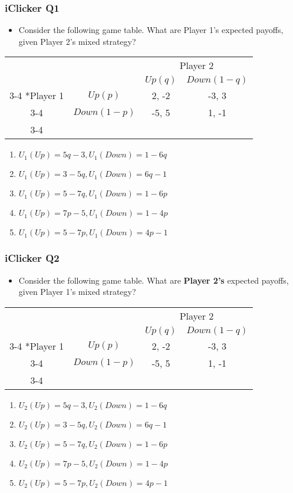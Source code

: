 \begin{frame}
\frametitle{iClicker Q1}
\begin{itemize}
\item Consider the following game table. What are Player 1's expected payoffs, given Player 2's mixed strategy?
\end{itemize}
\begin{table}[h]
\centering
\begin{tabular}{cc|c|c|}
	& \multicolumn{1}{c}{} & \multicolumn{2}{c}{Player 2}\\
	& \multicolumn{1}{c}{} & \multicolumn{1}{c}{$Up (q)$}  & \multicolumn{1}{c}{$Down (1 - q)$} \\\cline{3-4}
	\multirow{2}*{Player 1}  & $Up (p)$ & 2, -2 & -3, 3 \\\cline{3-4}
	& $Down (1 - p)$ & -5, 5 & 1, -1 \\\cline{3-4}
\end{tabular}
\end{table}
\begin{enumerate}
\item $U_1(Up) = 5q - 3, U_1(Down) = 1 - 6q$
\item $U_1(Up) = 3 - 5q, U_1(Down) = 6q - 1$
\item $U_1(Up) = 5 - 7q, U_1(Down) = 1 - 6p$
\item $U_1(Up) = 7p - 5, U_1(Down) = 1 - 4p$
\item $U_1(Up) = 5 - 7p, U_1(Down) = 4p - 1$
\end{enumerate}
\end{frame}

\begin{frame}
\frametitle{iClicker Q2}
\begin{itemize}
\item Consider the following game table. What are \textbf{Player 2's} expected payoffs, given Player 1's mixed strategy?
\end{itemize}
\begin{table}[h]
\centering
\begin{tabular}{cc|c|c|}
& \multicolumn{1}{c}{} & \multicolumn{2}{c}{Player 2}\\
& \multicolumn{1}{c}{} & \multicolumn{1}{c}{$Up (q)$}  & \multicolumn{1}{c}{$Down (1 - q)$} \\\cline{3-4}
\multirow{2}*{Player 1}  & $Up (p)$ & 2, -2 & -3, 3 \\\cline{3-4}
& $Down (1 - p)$ & -5, 5 & 1, -1 \\\cline{3-4}
\end{tabular}
\end{table}
\begin{enumerate}
\item $U_2(Up) = 5q - 3, U_2(Down) = 1 - 6q$
\item $U_2(Up) = 3 - 5q, U_2(Down) = 6q - 1$
\item $U_2(Up) = 5 - 7q, U_2(Down) = 1 - 6p$
\item $U_2(Up) = 7p - 5, U_2(Down) = 1 - 4p$
\item $U_2(Up) = 5 - 7p, U_2(Down) = 4p - 1$
\end{enumerate}
\end{frame}

